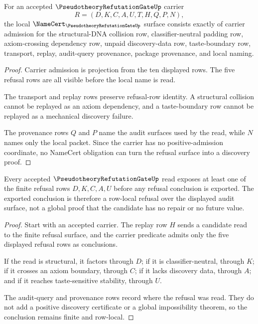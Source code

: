 \begin{theorem}
\label{thm:pseudotheory-refutation-gate-namecert-obligations}
For an accepted $\PseudotheoryRefutationGateUp$ carrier
$$
R=(D,K,C,A,U,T,H,Q,P,N),
$$
the local $\NameCert_{\PseudotheoryRefutationGateUp}$ surface consists exactly of carrier admission for the structural-DNA collision row, classifier-neutral padding row, axiom-crossing dependency row, unpaid discovery-data row, taste-boundary row, transport, replay, audit-query provenance, package provenance, and local naming.
\end{theorem}
\begin{proof}
Carrier admission is projection from the ten displayed rows. The five refusal rows are all visible before the local name is read.

The transport and replay rows preserve refusal-row identity. A structural collision cannot be replayed as an axiom dependency, and a taste-boundary row cannot be replayed as a mechanical discovery failure.

The provenance rows $Q$ and $P$ name the audit surfaces used by the read, while $N$ names only the local packet. Since the carrier has no positive-admission coordinate, no NameCert obligation can turn the refusal surface into a discovery proof.
\end{proof}

\begin{theorem}
\label{thm:pseudotheory-refutation-gate-finite-refusal-soundness}
Every accepted $\PseudotheoryRefutationGateUp$ read exposes at least one of the finite refusal rows $D,K,C,A,U$ before any refusal conclusion is exported. The exported conclusion is therefore a row-local refusal over the displayed audit surface, not a global proof that the candidate has no repair or no future value.
\end{theorem}
\begin{proof}
Start with an accepted carrier. The replay row $H$ sends a candidate read to the finite refusal surface, and the carrier predicate admits only the five displayed refusal rows as conclusions.

If the read is structural, it factors through $D$; if it is classifier-neutral, through $K$; if it crosses an axiom boundary, through $C$; if it lacks discovery data, through $A$; and if it reaches taste-sensitive stability, through $U$.

The audit-query and provenance rows record where the refusal was read. They do not add a positive discovery certificate or a global impossibility theorem, so the conclusion remains finite and row-local.
\end{proof}

